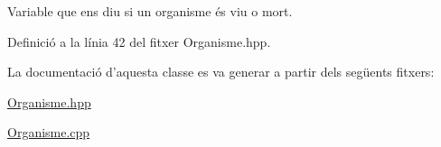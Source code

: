 Variable que ens diu si un organisme és viu o mort. 



Definició a la línia 42 del fitxer Organisme.\-hpp.



La documentació d'aquesta classe es va generar a partir dels següents fitxers\-:\begin{DoxyCompactItemize}
\item 
\hyperlink{_organisme_8hpp}{Organisme.\-hpp}\item 
\hyperlink{_organisme_8cpp}{Organisme.\-cpp}\end{DoxyCompactItemize}
